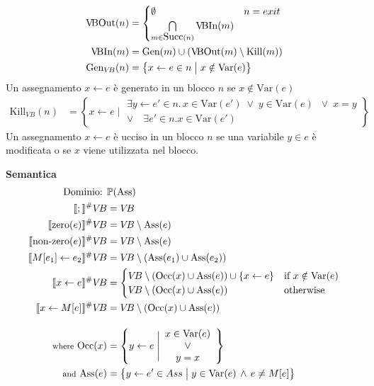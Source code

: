 \documentclass[a4paper,12pt,openany]{article}
\newcommand{\VB}{V\!B}
\begin{document}
\begin{align*}
\mbox{\VB Out}(n) &=
\begin{cases}
\emptyset & n = exit\\
\bigcap\limits_{m\in \mbox{Succ}(n)} \mbox{\VB In}(m)
\end{cases}\\
\mbox{\VB In}(m) &= \mbox{Gen}(m) \cup (\mbox{\VB Out}(m) \setminus \mbox{Kill}(m))\\
\mbox{Gen}_{\VB}(n) &= \left\{
x\leftarrow e \in n\;\big\vert\; x \notin\mbox{Var}(e)
\right\}
\end{align*}
Un assegnamento $x \gets e$ è generato in un blocco $n$ se $x \notin \mbox{Var}(e)$
\begin{align*}
\mbox{Kill}_{\VB}(n) &= \left\{
    x\leftarrow e \;\Big\vert\; 
    \begin{array}{cc}
        \exists y\leftarrow e'\in n.\, x\in \mbox{Var}(e') \;\lor\;
        y\in \mbox{Var}(e)\; \;\lor\;
        x = y\\
        \vee \quad \exists e' \in n. x\in \mbox{Var}(e')
    \end{array}
\right\}
\end{align*}
Un assegnamento $x \gets e$ è ucciso in un blocco $n$ se una variabile $y \in e$ è modificata o se $x$ viene utilizzata nel blocco.

\textbf{Semantica}
\begin{align*}
\mbox{Dominio: }& \mathbb{P}(\mbox{Ass})\\
\llbracket ; \rrbracket^\#\VB &= \VB\\
\llbracket \mbox{zero}(e) \rrbracket^\#\VB &= \VB \setminus \mbox{Ass}(e)\\
\llbracket \mbox{non-zero}(e) \rrbracket^\#\VB &= \VB \setminus \mbox{Ass}(e)\\
\llbracket M[e_1]\leftarrow e_2 \rrbracket^\#\VB &= \VB \setminus (\mbox{Ass}(e_1) \cup \mbox{Ass}(e_2))\\
\llbracket x \leftarrow e \rrbracket^\#\VB &= 
\begin{cases}
\VB \setminus (\mbox{Occ}(x) \cup \mbox{Ass}(e)) \cup \{x\leftarrow e\}& \mbox{if } x \notin \mbox{Var}(e)\\
\VB \setminus (\mbox{Occ}(x) \cup \mbox{Ass}(e)) & \mbox{otherwise}
\end{cases}\\
\llbracket x\leftarrow M[e] \rrbracket^\#\VB &= \VB \setminus (\mbox{Occ}(x) \cup \mbox{Ass}(e))\\[1em]
\mbox{{\footnotesize where} Occ}(x) &=
\left\{
    y\leftarrow e \;\Bigg\vert
    \begin{array}{cc}
        x \in \mbox{Var}(e)\\
        \lor\\
        y=x
    \end{array}
\right\}\\
\mbox{{\footnotesize and} Ass}(e) &=
\left\{
y\leftarrow e' \in Ass \;\big\vert\;
y \in \mbox{Var}(e) \,\land\, e \neq M[e]
\right\}\\
\end{align*}
\end{document}
